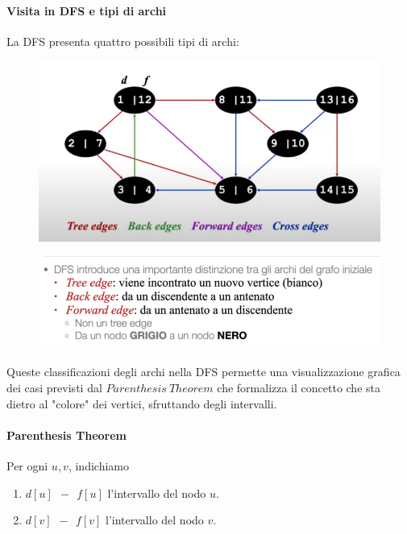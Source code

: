 \documentclass{article}
\begin{document}
\paragraph{Visita in DFS e tipi di archi}

La DFS presenta quattro possibili tipi di archi:

\begin{figure}[htbp]
        \center
        \includegraphics[scale=0.55]{img/DFS2.png}
\end{figure}

\begin{figure}[htbp]
        \center
        \includegraphics[scale=0.55]{img/DFS3.png}
\end{figure}

Queste classificazioni degli archi nella DFS permette una visualizzazione grafica dei casi previsti dal $Parenthesis \: Theorem$ che formalizza il concetto che sta dietro al "colore" dei vertici, sfruttando degli intervalli.

\newpage

\paragraph{Parenthesis Theorem} Per ogni $u,v$, indichiamo

\begin{enumerate}
    \item $d[u] \: \: - \: \: f[u] $ l'intervallo del nodo $u$.
    \item $d[v] \: \: - \: \: f[v] $ l'intervallo del nodo $v$.
\end{enumerate}
\end{document}
